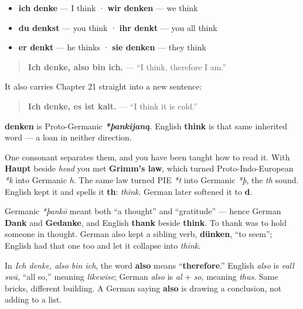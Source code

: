 \begin{itemize}
\raggedright
  \item \textbf{ich denke} — I think · \textbf{wir denken} — we think
  \item \textbf{du denkst} — you think · \textbf{ihr denkt} — you all think
  \item \textbf{er denkt} — he thinks · \textbf{sie denken} — they think
\end{itemize}

\begin{quote}
\textbf{Ich denke, also bin ich.} — \textquotedblleft{}I think, therefore I am.\textquotedblright{}
\end{quote}

It also carries Chapter 21 straight into a new sentence:

\begin{quote}
\textbf{Ich denke, es ist kalt.} — \textquotedblleft{}I think it is cold.\textquotedblright{}
\end{quote}

\begin{cousinweb}
\textbf{denken} is Proto-Germanic \emph{\textbf{*þankijaną}}. English \textbf{think} is that same inherited word — a loan in neither direction.

One consonant separates them, and you have been taught how to read it. With \textbf{Haupt} beside \emph{head} you met \textbf{Grimm's law}, which turned Proto-Indo-European \emph{*k} into Germanic \emph{h}. The same law turned PIE \emph{*t} into Germanic \emph{*þ}, the \emph{th} sound. English kept it and spells it \textbf{th}: \emph{think}. German later softened it to \textbf{d}.

Germanic \emph{*þankō} meant both \textquotedblleft{}a thought\textquotedblright{} and \textquotedblleft{}gratitude\textquotedblright{} — hence German \textbf{Dank} and \textbf{Gedanke}, and English \textbf{thank} beside \textbf{think}. To thank was to hold someone in thought. German also kept a sibling verb, \textbf{dünken}, \textquotedblleft{}to seem\textquotedblright{}; English had that one too and let it collapse into \emph{think}.
\end{cousinweb}

\begin{grammarlens}[title={Grammar Lens: also does not mean \textquotedblleft{}also\textquotedblright{}}]
In \emph{Ich denke, also bin ich}, the word \textbf{also} means \textquotedblleft{}\textbf{therefore}.\textquotedblright{} English \emph{also} is \emph{eall swā}, \textquotedblleft{}all so,\textquotedblright{} meaning \emph{likewise}; German \emph{also} is \emph{al} + \emph{so}, meaning \emph{thus}. Same bricks, different building. A German saying \textbf{also} is drawing a conclusion, not adding to a list.
\end{grammarlens}


